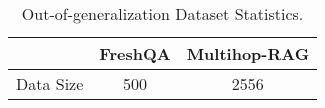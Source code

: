 \begin{table}[h]
\centering
\caption{Out-of-generalization Dataset Statistics.}
\label{tab:ood_statistics} 
\begin{tabular}{@{}lcc@{}}
\toprule
          & \textbf{FreshQA} & \textbf{Multihop-RAG} \\ \midrule
Data Size & 500              & 2556                  \\ \bottomrule
\end{tabular}
\end{table}